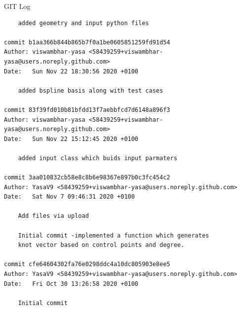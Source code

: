 \documentclass[a4paper,12pt,times]{article}
\begin{document}
\begin{section}{GIT Log}
\begin{verbatim}
    added geometry and input python files

commit b1aa366b844b865b7f0a1be0605851259fd91d54
Author: viswambhar-yasa <58439259+viswambhar-yasa@users.noreply.github.com>
Date:   Sun Nov 22 18:30:56 2020 +0100

    added bspline basis along with test cases

commit 83f39fd010b81bfdd13f7aebbfcd7d6148a896f3
Author: viswambhar-yasa <58439259+viswambhar-yasa@users.noreply.github.com>
Date:   Sun Nov 22 15:12:45 2020 +0100

    added input class which buids input parmaters

commit 3aa010832cb58e8c8b6e98367e897b0c3fc454c2
Author: YasaV9 <58439259+viswambhar-yasa@users.noreply.github.com>
Date:   Sat Nov 7 09:46:31 2020 +0100

    Add files via upload
    
    Initial commit -implemented a function which generates 
    knot vector based on control points and degree.

commit cfe64604302fa76e0298ddc4a10dc805903e8ee5
Author: YasaV9 <58439259+viswambhar-yasa@users.noreply.github.com>
Date:   Fri Oct 30 13:26:58 2020 +0100

    Initial commit

\end{verbatim}
\end{section}
%

%

%

\newpage



\end{document}
